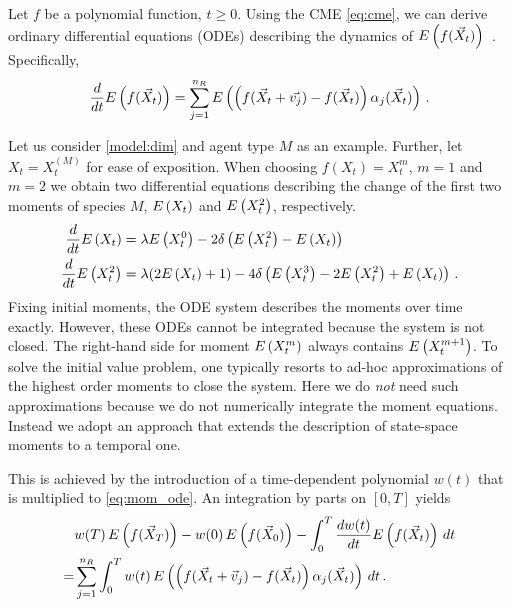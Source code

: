Let $f$ be a polynomial function, $t\ge0$.
Using the CME \eqref{eq:cme}, we can derive ordinary differential equations (ODEs)
describing the dynamics of ${E}\left(f(\vec{X}_t)\right)$~\cite{engblom2006computing}.
Specifically,
\begin{equation}\label{eq:mom_ode}
    \frac{d}{dt}{E}\left(f(\vec X_t)\right) = \sum_{j=1}^{n_R}{E}\left(\left(f({\vec X_t +
    \vec{v_j}}) - f(\vec X_t)\right)\alpha_j(\vec X_t)\right)\,.
\end{equation}

Let us consider \autoref{model:dim} and agent type $M$ as an example.
Further, let $X_t=X_t^{(M)}$
for ease of exposition.
When choosing $f(X_t)=X_t^m$, $m=1$ and   $m=2$
we obtain two differential equations describing
the change of the first two moments of species $M$,
${E}\left(X_t\right)$ and ${E}\left(X_t^2\right)$, respectively.
\begin{equation}\label{eq:dim_exp_ode}
	\begin{split}
    \frac{d}{dt}{E}\left({X}_t\right) &= \lambda{E}\left({X}_t^0\right) -
    2{\delta}\left({E}\left({X}_t^2\right)-{E}\left({X}_t\right)\right)\\
    \frac{d}{dt}{E}\left({X}_t^2\right) &= \lambda(2{E}\left({X}_t\right) + 1) - 4\delta\left({E}\left({X}_t^3\right) -
    2{E}\left({X}_t^2\right) + {E}\left({X}_t\right)\right)\,.
	\end{split}
\end{equation}
Fixing initial moments, the ODE system describes the moments over time exactly.
However, these ODEs cannot be integrated because the system is not closed.
The right-hand side for moment ${E}\left(X_t^m\right)$ always contains ${E}\left(X_t^{m+1}\right)$.
To solve the initial value problem,
one typically resorts to ad-hoc approximations of the highest order moments
to close the system. Here we do \emph{not} need such approximations
because we do not numerically integrate the moment equations.
Instead we adopt an approach \cite{dowdy2018dynamic,sakurai2019bounding} that extends
the description of state-space moments to a temporal one.

This is achieved by the introduction of a time-dependent polynomial $w(t)$ that is multiplied to
\eqref{eq:mom_ode}.
An integration by parts on $[0, T]$ yields~\cite{dowdy2018dynamic,sakurai2019bounding}
\begin{equation}\label{eq:exp_constraint}
\begin{split}
        & w(T)\,{E}\left(f(\vec X_T)\right)
        - w(0)\,{E}\left(f(\vec X_{0})\right)
        - \int_{0}^{T}\frac{dw(t)}{dt}{E}\left(f(\vec X_t)\right)\,dt\\
        =&\sum_{j=1}^{n_R}\int_{0}^{T}w(t)\,
        {E}\left(\left(f{(\vec X_t + \vec v_j)} - f(\vec X_t)\right)\alpha_j(\vec X_t)\right)\,dt\,.
        \end{split}
\end{equation}

